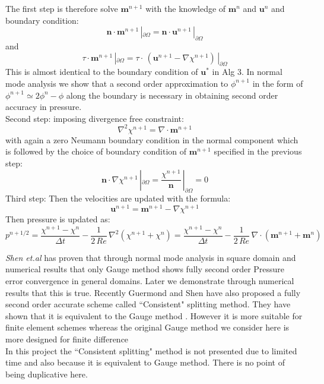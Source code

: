 The first step is therefore solve $\textbf{m}^{n+1}$ with the knowledge of $\textbf{m}^n$ and $\textbf{u}^n$ and boundary condition:
\begin{equation*}\label{Eq:n}
\textbf{n}\cdot\textbf{m}^{n+1}\,|_{\partial \Omega} = \textbf{n} \cdot \textbf{u}^{n+1}\,|_{\partial \Omega}
\end{equation*}
and 
\begin{equation*}
\textbf{$\tau$}\cdot\textbf{m}^{n+1}\,|_{\partial \Omega} = \textbf{$\tau$} \cdot\,(\textbf{u}^{n+1} - \nabla \chi^{n+1})\,|_{\partial \Omega}
\end{equation*}
This is almost identical to the boundary condition of $\textbf{u}^*$ in Alg 3. In normal mode analysis we show that a second order approximation to $\phi^{n+1}$ in the form of $\phi^{n+1}\simeq 2\phi^n - \phi$ along the boundary is necessary in obtaining second order accuracy in pressure.\\

Second step: imposing divergence free constraint:
\begin{equation*}
\nabla^2\chi^{n+1} = \nabla \cdot \textbf{m}^{n+1}
\end{equation*}
with again a zero Neumann boundary condition in the normal component which is followed by the choice of boundary condition of $\textbf{m}^{n+1}$ specified in the previous step:
\begin{equation*}
\textbf{n} \cdot \nabla \chi^{n+1}\,|_{\partial \Omega}  = \dfrac{\chi^{n+1}}{\textbf{n}}\,|_{\partial \Omega}  = 0
\end{equation*}
Third step: Then the velocities are updated with the formula:
\begin{equation*}
\textbf{u}^{n+1} = \textbf{m}^{n+1} - \nabla \chi^{n+1}
\end{equation*}
Then pressure is updated as:
\begin{equation*}
p^{n+1/2} = \dfrac{\chi^{n+1} - \chi^n}{\Delta t} - \dfrac{1}{2\,Re}\,\nabla^2(\chi^{n+1} + \chi^n) = \dfrac{\chi^{n+1} - \chi^n}{\Delta t} - \dfrac{1}{2\,Re}\,\nabla \cdot (\textbf{m}^{n+1} + \textbf{m}^n)
\end{equation*}

\emph{Shen et.al} has proven that through normal mode analysis in square domain and numerical results that only Gauge method shows fully second order Pressure error convergence in general domains. Later we demonstrate through numerical results that this is true. Recently Guermond and Shen have also proposed a fully second order accurate scheme called ``Consistent" splitting method. They have shown that it is equivalent to the Gauge method \cite{wong2006consistent,pyo2005normal,guermond2006overview}. However it is more suitable for finite element schemes whereas the original Gauge method we consider here is more designed for finite difference \cite{pyo2005normal}\\

In this project the ``Consistent splitting" method is not presented due to limited time and also because it is equivalent to Gauge method. There is no point of being duplicative here.

